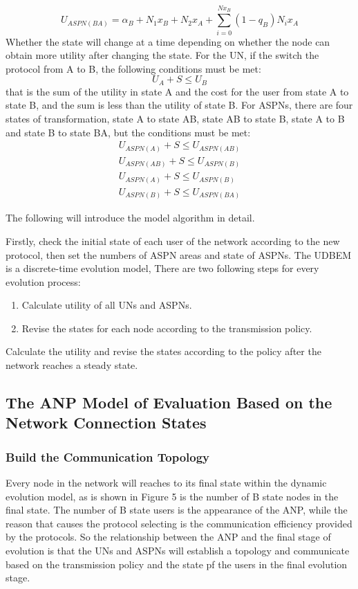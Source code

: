 \documentclass{article}
\begin{document}
\begin{displaymath}
U_{ASPN(BA)}=\alpha_{B}+N_{1}x_{B}+N_{2}x_{A}+\sum_{i=0}^{Nx_{B}}(1-q_{B})N_{i}x_{A}
\end{displaymath}
Whether the state will change at a time depending on whether the node can obtain more utility after
changing the state. For the UN, if the switch the protocol from A to B, the following conditions
must be met:
\begin{displaymath}
U_{A}+S\leq U_{B}
\end{displaymath}
that is the sum of the utility in state A and the cost for the user from state A to state B, and the
sum is less than the utility of state B. For ASPNs, there are four states of transformation, state A
to state AB, state AB to state B, state A to B and state B to state BA, but the conditions must be met:
\begin{equation}
\begin{aligned}
U_{ASPN(A)}+S \leq U_{ASPN(AB)}\\
U_{ASPN(AB)}+S \leq U_{ASPN(B)}\\
U_{ASPN(A)}+S \leq U_{ASPN(B)}\\
U_{ASPN(B)}+S \leq U_{ASPN(BA)}
\end{aligned}
\end{equation}

The following will introduce the model algorithm in detail.

Firstly, check the initial state of each user of the network according to the new protocol, then set
the numbers of ASPN areas and state of ASPNs. The UDBEM is a discrete-time evolution model, There are
two following steps for every evolution process:
\begin{enumerate}
    \item Calculate utility of all UNs and ASPNs.
    \item Revise the states for each node according to the transmission policy.
\end{enumerate}
Calculate the utility and revise the states according to the policy after the network reaches a steady state.

\subsection{The ANP Model of Evaluation Based on the Network Connection States}

\subsubsection{Build the Communication Topology}
Every node in the network will reaches to its final state within the dynamic evolution model, as is
shown in Figure 5 is the number of B state nodes in the final state. The number of B state users is
the appearance of the ANP, while the reason that causes the protocol selecting is the communication
efficiency provided by the protocols. So the relationship between the ANP and the final stage of
evolution is that the UNs and ASPNs will establish a topology and communicate based on the transmission
policy and the state pf the users in the final evolution stage.
\par
\end{document}
